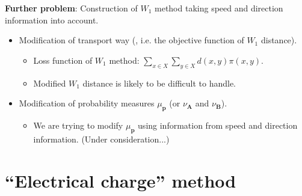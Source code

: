 \documentclass[aspectratio=169, bigfiles]{beamer}
\newcommand{\dis}{\displaystyle}
\begin{document}
\begin{frame} %
\begin{tcolorbox}[colframe=yellow,
colback=yellow!10!white,
colbacktitle=yellow!40!white,
coltitle=black, fonttitle=\bfseries]
\textbf{Further problem}: 
Construction of $W_1$ method taking speed and direction information into account.
\end{tcolorbox}

\begin{itemize}
    \item Modification of transport way (, i.e. the objective function of $W_1$ distance).
    \begin{itemize}
        \item Loss function of $W_1$ method: $\dis \sum_{x\in X}\sum_{y\in X} d(x,y)\pi(x,y)$.
        \item Modified $W_1$ distance is likely to be difficult to handle.
    \end{itemize}
    \item Modification of probability measures $\mu_\mathbf{p}$ (or $\nu_\mathbf{A}$ and $\nu_\mathbf{B}$).
    \begin{itemize}
        \item We are trying to modify $\mu_\mathbf{p}$ using information from speed and direction information. (Under consideration...)
    \end{itemize}
\end{itemize}

\end{frame}

\section{``Electrical charge'' method}
\end{document}

